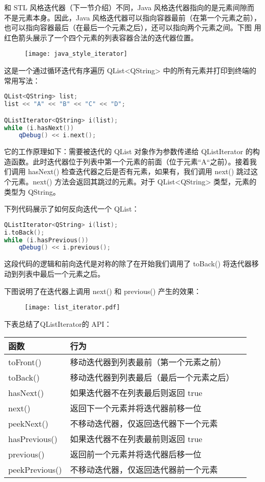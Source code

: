和 STL 风格迭代器（下一节介绍）不同，Java 风格迭代器指向的是元素间隙而
不是元素本身。因此，Java 风格迭代器可以指向容器最前（在第一个元素之前），
也可以指向容器最后（在最后一个元素之后），还可以指向两个元素之间。下图
用红色箭头展示了一个四个元素的列表容器合法的迭代器位置。

\begin{figure}[hbt!]  
	\centering
    \texttt{[image: java\_style\_iterator]}
\end{figure}

这是一个通过循环迭代有序遍历 QList<QString> 中的所有元素并打印到终端的
常用写法：

\begin{lstlisting}[language=C++]
QList<QString> list;
list << "A" << "B" << "C" << "D";

QListIterator<QString> i(list);
while (i.hasNext())
    qDebug() << i.next();

\end{lstlisting}

它的工作原理如下：需要被迭代的 QList 对象作为参数传递给 QListIterator 的构造函数。此时迭代器位于列表中第一个元素的前面（位于元素“A“之前）。接着我们调用 hasNext() 检查迭代器之后是否有元素，如果有，我们调用 next() 跳过这个元素。next() 方法会返回其跳过的元素。对于 QList<QString> 类型，元素的类型为 QString。

下列代码展示了如何反向迭代一个 QList：

\begin{lstlisting}[language=C++]
QListIterator<QString> i(list);
i.toBack();
while (i.hasPrevious())
    qDebug() << i.previous();

\end{lstlisting}

这段代码的逻辑和前向迭代是对称的除了在开始我们调用了 toBack() 将迭代器移动到列表中最后一个元素之后。

下图说明了在迭代器上调用 next() 和 previous() 产生的效果：

\begin{figure}[hbt!]  
	\centering
    \texttt{[image: list\_iterator.pdf]}
\end{figure}

下表总结了QListIterator的 API：

\begin{tabular}{|l|l|l|}
\hline
函数&	行为\\
\hline
toFront()&	移动迭代器到列表最前（第一个元素之前）\\
\hline
toBack()&	移动迭代器到列表最后（最后一个元素之后）\\
\hline
hasNext()&	如果迭代器不在列表最后则返回 true\\
\hline
next()&	返回下一个元素并将迭代器前移一位\\
\hline
peekNext()&	不移动迭代器，仅返回迭代器下一个元素\\
\hline
hasPrevious()&	如果迭代器不在列表最前则返回 true\\
\hline
previous()&	返回前一个元素并将迭代器后移一位\\
\hline
peekPrevious()&	不移动迭代器，仅返回迭代器前一个元素\\
\hline
\end{tabular}

